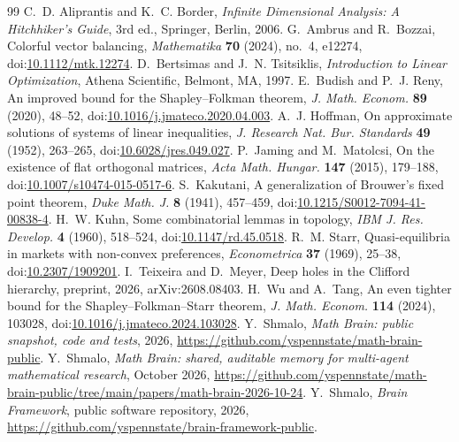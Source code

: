 \documentclass[11pt]{amsart}
\theoremstyle{remark}
\numberwithin{equation}{section}
\newcommand{\doi}[1]{doi:\href{https://doi.org/#1}{#1}}
\begin{document}
\begin{thebibliography}{99}
 C.~D. Aliprantis and K.~C. Border, \emph{Infinite Dimensional Analysis: A Hitchhiker's Guide}, 3rd ed., Springer, Berlin, 2006.
 G.~Ambrus and R.~Bozzai, Colorful vector balancing, \emph{Mathematika} \textbf{70} (2024), no.~4, e12274, \doi{10.1112/mtk.12274}.
 D.~Bertsimas and J.~N. Tsitsiklis, \emph{Introduction to Linear Optimization}, Athena Scientific, Belmont, MA, 1997.
 E.~Budish and P.~J. Reny, An improved bound for the Shapley--Folkman theorem, \emph{J. Math. Econom.} \textbf{89} (2020), 48--52, \doi{10.1016/j.jmateco.2020.04.003}.
 A.~J. Hoffman, On approximate solutions of systems of linear inequalities, \emph{J. Research Nat. Bur. Standards} \textbf{49} (1952), 263--265, \doi{10.6028/jres.049.027}.
 P.~Jaming and M.~Matolcsi, On the existence of flat orthogonal matrices, \emph{Acta Math. Hungar.} \textbf{147} (2015), 179--188, \doi{10.1007/s10474-015-0517-6}.
 S.~Kakutani, A generalization of Brouwer's fixed point theorem, \emph{Duke Math. J.} \textbf{8} (1941), 457--459, \doi{10.1215/S0012-7094-41-00838-4}.
 H.~W. Kuhn, Some combinatorial lemmas in topology, \emph{IBM J. Res. Develop.} \textbf{4} (1960), 518--524, \doi{10.1147/rd.45.0518}.
 R.~M. Starr, Quasi-equilibria in markets with non-convex preferences, \emph{Econometrica} \textbf{37} (1969), 25--38, \doi{10.2307/1909201}.
 I.~Teixeira and D.~Meyer, Deep holes in the Clifford hierarchy, preprint, 2026, arXiv:2608.08403.
 H.~Wu and A.~Tang, An even tighter bound for the Shapley--Folkman--Starr theorem, \emph{J. Math. Econom.} \textbf{114} (2024), 103028, \doi{10.1016/j.jmateco.2024.103028}.
 Y.~Shmalo, \emph{Math Brain: public snapshot, code and tests}, 2026, \url{https://github.com/yspennstate/math-brain-public}.
 Y.~Shmalo, \emph{Math Brain: shared, auditable memory for multi-agent mathematical research}, October 2026, \url{https://github.com/yspennstate/math-brain-public/tree/main/papers/math-brain-2026-10-24}.
 Y.~Shmalo, \emph{Brain Framework}, public software repository, 2026, \url{https://github.com/yspennstate/brain-framework-public}.
\end{thebibliography}
\end{document}
